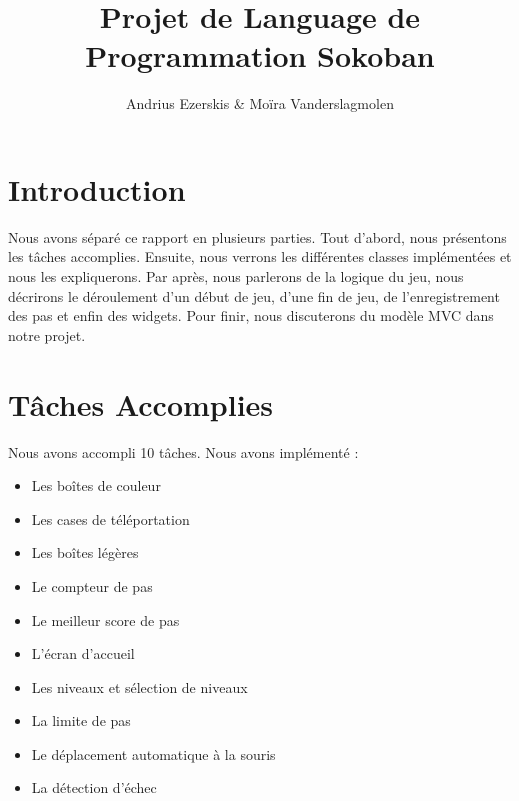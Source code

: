 \documentclass[utf8]{article}
\begin{document}
\begin{titlepage}


\author{Andrius Ezerskis \& Moïra Vanderslagmolen}
\title{Projet de Language de Programmation Sokoban}

\maketitle
\end{titlepage}
\begin{large}

\section{Introduction}
\par
\indent
Nous avons séparé ce rapport en plusieurs parties. Tout d'abord, nous présentons
les tâches accomplies. Ensuite, nous verrons les différentes classes
implémentées et nous les expliquerons. Par après, nous parlerons de la logique
du jeu, nous décrirons le déroulement d'un début de jeu, d'une fin de jeu, de
l'enregistrement des pas et enfin des widgets. Pour finir, nous discuterons du
modèle MVC dans notre projet.

\par

\section{Tâches Accomplies}

\par
\indent

Nous avons accompli 10 tâches.
Nous avons implémenté :

\begin{itemize}
    \item Les boîtes de couleur
    \item Les cases de téléportation
    \item Les boîtes légères
    \item Le compteur de pas
    \item Le meilleur score de pas
    \item L'écran d'accueil
    \item Les niveaux et sélection de niveaux 
    \item La limite de pas
    \item Le déplacement automatique à la souris
    \item La détection d'échec
  \end{itemize}


\end{large}
\end{document}
